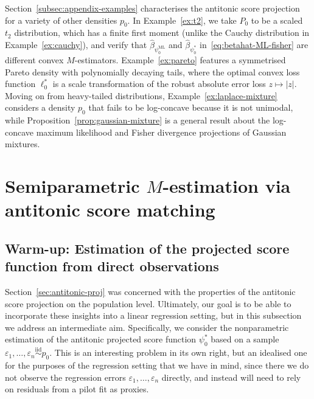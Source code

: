 \documentclass[a4paper]{article}
\newcommand{\iid}{\overset{\mathrm{iid}}{\sim}}
\theoremstyle{definition}
\begin{document}
Section~\ref{subsec:appendix-examples} characterises the antitonic score projection for a variety of other densities $p_0$. In Example~\ref{ex:t2}, we take $P_0$ to be a scaled $t_2$ distribution, which has a finite first moment (unlike the Cauchy distribution in Example~\ref{ex:cauchy}), and verify that $\hat{\beta}_{\psi_0^{\mathrm{ML}}}$ and $\hat{\beta}_{\psi_0^*}$ in~\eqref{eq:betahat-ML-fisher} are different convex $M$-estimators. Example~\ref{ex:pareto} features a symmetrised Pareto density with polynomially decaying tails, where the optimal convex loss function $\ell_0^*$ is a scale transformation of the robust absolute error loss $z \mapsto |z|$. Moving on from heavy-tailed distributions, Example~\ref{ex:laplace-mixture} considers a density $p_0$ that fails to be log-concave because it is not unimodal, while Proposition~\ref{prop:gaussian-mixture} is a general result about the log-concave maximum likelihood and Fisher divergence projections of Gaussian mixtures.

\section{Semiparametric \texorpdfstring{$M$-estimation}{M-estimation} via antitonic score matching}
\label{sec:regression}

\subsection{Warm-up: Estimation of the projected score function from direct observations}
\label{subsec:score-estimation}

Section~\ref{sec:antitonic-proj} was concerned with the properties of the antitonic score projection on the population level.  Ultimately, our goal is to be able to incorporate these insights into a linear regression setting, but in this subsection we address an intermediate aim.  Specifically, we consider the nonparametric estimation of the antitonic projected score function $\psi_0^*$ based on a sample $\varepsilon_1,\dotsc,\varepsilon_n \iid p_0$.  This is an interesting problem in its own right, but an idealised one for the purposes of the regression setting that we have in mind, since there we do not observe the regression errors $\varepsilon_1,\dotsc,\varepsilon_n$ directly, and instead will need to rely on residuals from a pilot fit as proxies. 
\end{document}
